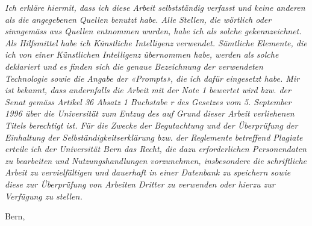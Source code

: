 
\vspace*{0cm}
\vfill
\noindent\parbox[b][0.5\textheight]{\textwidth}
{
\textit{\glqq Ich erkl{\"a}re hiermit, dass ich diese Arbeit selbstst{\"a}ndig verfasst und keine anderen als die angegebenen Quellen benutzt habe. Alle Stellen, die w{\"o}rtlich oder sinngem{\"a}ss aus Quellen entnommen wurden, habe ich als solche gekennzeichnet. Als Hilfsmittel habe ich K{\"u}nstliche Intelligenz verwendet. S{\"a}mtliche Elemente, die ich von einer K{\"u}nstlichen Intelligenz \"{u}bernommen habe, werden als solche deklariert und es finden sich die genaue Bezeichnung der verwendeten Technologie sowie die Angabe der «Prompts», die ich daf{\"u}r eingesetzt habe. Mir ist bekannt, dass andernfalls die Arbeit mit der Note 1 bewertet wird bzw. der Senat gem{\"a}ss Artikel 36 Absatz 1 Buchstabe r des Gesetzes vom 5. September 1996 \"{u}ber die Universit{\"a}t zum Entzug des auf Grund dieser Arbeit verliehenen Titels berechtigt ist.\newline
F{\"u}r die Zwecke der Begutachtung und der {\"U}berpr{\"u}fung der Einhaltung der Selbst{\"a}ndigkeitserkl{\"a}rung bzw. der Reglemente betreffend Plagiate erteile ich der Universit{\"a}t Bern das Recht, die dazu erforderlichen Personendaten zu bearbeiten und Nutzungshandlungen vorzunehmen, insbesondere die schriftliche Arbeit zu vervielf{\"a}ltigen und dauerhaft in einer Datenbank zu speichern sowie diese zur {\"U}berpr{\"u}fung von Arbeiten Dritter zu verwenden oder hierzu zur Verf{\"u}gung zu stellen.\grqq{}}\par
		\vspace{1.5cm}
		\noindent\normalsize\normalfont
		{
			Bern, \thedate\par
		}\par
		\vspace{1.5cm}
		\noindent\normalsize\normalfont
		{
			\theauthor\par
		}\par
}\par